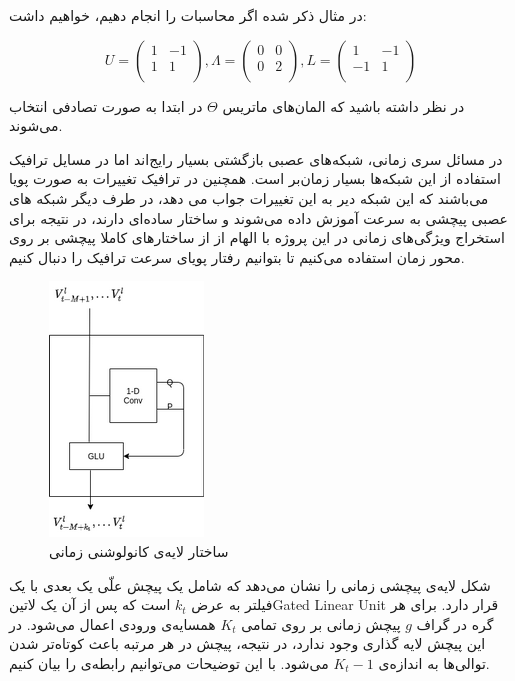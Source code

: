 \documentclass{article}
\begin{document}
در مثال ذکر شده اگر محاسبات را انجام دهیم، خواهیم داشت:

\[
U = \left(
  \begin{array}{cc}
  1 & -1 \\
  1 & 1 \\
  \end{array}
\right),
\Lambda = \left(
  \begin{array}{cc}
  0 & 0 \\
  0 & 2 \\
  \end{array}
\right),
L = \left(
  \begin{array}{cc}
  1 & -1 \\
  -1 & 1 \\
  \end{array}
\right)
\]

در نظر داشته باشید که المان‌های ماتریس $\Theta$ در ابتدا به صورت تصادفی انتخاب می‌شوند.

در مسائل سری زمانی، شبکه‌های عصبی بازگشتی بسیار رایج‌اند اما در مسایل ترافیک استفاده از این شبکه‌ها بسیار زمان‌بر است.
همچنین در ترافیک تغییرات به صورت پویا می‌باشند که این شبکه دیر به این تغییرات جواب می دهد،
در طرف دیگر شبکه های عصبی پیچشی به سرعت آموزش داده می‌شوند و ساختار ساده‌ای دارند، در نتیجه برای استخراج ویژگی‌های زمانی در این پروژه با الهام از
 از ساختارهای کاملا پیچشی بر روی محور زمان استفاده می‌کنیم تا بتوانیم رفتار پویای سرعت ترافیک را دنبال کنیم.

\begin{figure}
  \includegraphics{./images/time-conv.png}
  \centering
  \caption{
ساختار لایه‌ی کانولوشنی زمانی 
  }
  \label{fig:time-conv}
\end{figure}

شکل  لایه‌ی پیچشی زمانی را نشان می‌دهد که شامل یک پیچش علّی یک بعدی
با یک فیلتر به عرض  $k_{t}$ است که پس از آن یک ‌لاتین{Gated Linear Unit} قرار دارد.
برای هر گره در گراف $g$ پیچش زمانی بر روی تمامی $K_{t}$ همسایه‌ی ورودی اعمال می‌شود.
در این پیچش لایه گذاری وجود ندارد‌‌، در نتیجه، پیچش در هر مرتبه باعث کوتاه‌تر شدن توالی‌ها به اندازه‌ی $K_{t}-1$ می‌شود.
با این توضیحات می‌توانیم رابطه‌ی  را بیان کنیم.
\end{document}

